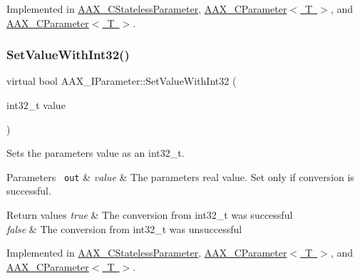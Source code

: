Implemented in \mbox{\hyperlink{a01541_a9cd0c740db21f050c01efaab37afba54}{A\+A\+X\+\_\+\+C\+Stateless\+Parameter}}, \mbox{\hyperlink{a01537_aa741c6432107eab6bf8796833a6f2cde}{A\+A\+X\+\_\+\+C\+Parameter$<$ T $>$}}, and \mbox{\hyperlink{a01537_a2089ea0d243087c562ce8b1bd89a495a}{A\+A\+X\+\_\+\+C\+Parameter$<$ T $>$}}.

\mbox{\label{a01857_aa2b8cfdd30ff25e47c4c2a8609d1e06f}} 
\subsubsection{\texorpdfstring{SetValueWithInt32()}{SetValueWithInt32()}}
{\footnotesize\ttfamily virtual bool A\+A\+X\+\_\+\+I\+Parameter\+::\+Set\+Value\+With\+Int32 (\begin{DoxyParamCaption}\item[{int32\+\_\+t}]{value }\end{DoxyParamCaption})\hspace{0.3cm}{\ttfamily [pure virtual]}}



Sets the parameter\textquotesingle{}s value as an int32\+\_\+t. 


\begin{DoxyParams}[1]{Parameters}
\mbox{\texttt{ out}}  & {\em value} & The parameter\textquotesingle{}s real value. Set only if conversion is successful.\\
\hline
\end{DoxyParams}

\begin{DoxyRetVals}{Return values}
{\em true} & The conversion from int32\+\_\+t was successful \\
\hline
{\em false} & The conversion from int32\+\_\+t was unsuccessful \\
\hline
\end{DoxyRetVals}


Implemented in \mbox{\hyperlink{a01541_a9656189927f1e6bc593e72dc9a3350ac}{A\+A\+X\+\_\+\+C\+Stateless\+Parameter}}, \mbox{\hyperlink{a01537_a0071856d5eafd8053126642b63a41f4f}{A\+A\+X\+\_\+\+C\+Parameter$<$ T $>$}}, and \mbox{\hyperlink{a01537_aaf45f020a267f894429b4a75ddbe9c6c}{A\+A\+X\+\_\+\+C\+Parameter$<$ T $>$}}.

\mbox{\label{a01857_a1d37b80bc3a9c4e53fc2c1684f47dfb7}} 

